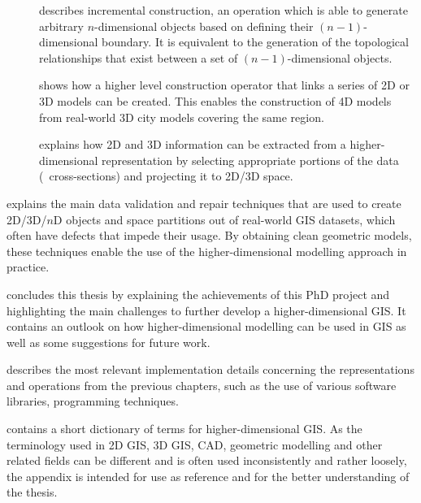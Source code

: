 \begin{description}
\begin{description}
\item[]
describes incremental construction, an operation which is able to generate arbitrary $n$-dimensional objects based on defining their $(n-1)$-dimensional boundary.
It is equivalent to the generation of the topological relationships that exist between a set of $(n-1)$-dimensional objects.

\item[]
shows how a higher level construction operator that links a series of 2D or 3D models can be created.
This enables the construction of 4D models from real-world 3D city models covering the same region.

\item[]
explains how 2D and 3D information can be extracted from a higher-dimensional representation by selecting appropriate portions of the data (\eg\ cross-sections) and projecting it to 2D/3D space.

\end{description}


\item[\refch{ch:cleaning}]
explains the main data validation and repair techniques that are used to create 2D/3D/$n$D objects and space partitions out of real-world GIS datasets, which often have defects that impede their usage.
By obtaining clean geometric models, these techniques enable the use of the higher-dimensional modelling approach in practice.


\item[\refch{ch:conclusions}]
concludes this thesis by explaining the achievements of this PhD project and highlighting the main challenges to further develop a higher-dimensional GIS.\@
It contains an outlook on how higher-dimensional modelling can be used in GIS as well as some suggestions for future work.

\item[\refap{ch:implementation}]
describes the most relevant implementation details concerning the representations and operations from the previous chapters, such as the use of various software libraries,  programming techniques.

\item[\refap{ch:dictionary}] 
contains a short dictionary of terms for higher-dimensional GIS.\@
As the terminology used in 2D GIS, 3D GIS, CAD, geometric modelling and other related fields can be different and is often used inconsistently and rather loosely, the appendix is intended for use as reference and for the better understanding of the thesis.

\end{description}
